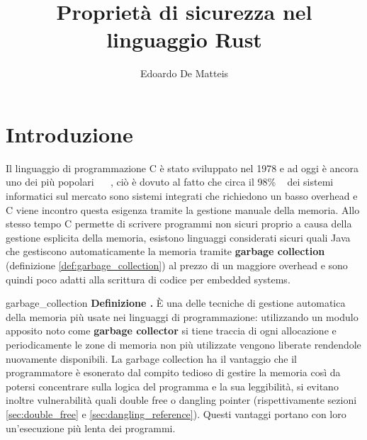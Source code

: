 \documentclass[Lau,binding=0.6cm]{sapthesis}
\title{Proprietà di sicurezza nel linguaggio Rust}
\author{Edoardo De Matteis}
\newenvironment{myDefinition}[2]{ \begin{Definizione}[adjusted title=#1]{}{#2}
    \textbf{Definizione \thetcbcounter.} }{\end{Definizione}}
\begin{document}
\frontmatter

\maketitle




\tableofcontents


\mainmatter

\chapter{Introduzione} \label{sec:politica_di_sicurezza}
Il linguaggio di programmazione C è stato sviluppato nel 1978 e ad oggi è ancora uno dei più popolari ~\cite{tiobe:index} ~\cite{pypl:index}, ciò è dovuto al fatto che circa il 98\% ~\cite{real_men_program_in_c} dei sistemi informatici sul mercato sono sistemi integrati che richiedono un basso overhead e C viene incontro questa esigenza tramite la gestione manuale della memoria. 
Allo stesso tempo C permette di scrivere programmi non sicuri proprio a causa della gestione esplicita della memoria, esistono linguaggi considerati sicuri quali Java che gestiscono automaticamente la memoria tramite \textbf{garbage collection} (definizione \ref{def:garbage_collection}) al prezzo di un maggiore overhead e sono quindi poco adatti alla scrittura di codice per embedded systems.

\begin{myDefinition}{Garbage collection}{garbage_collection}
    È una delle tecniche di gestione automatica della memoria più usate nei linguaggi di programmazione: utilizzando un modulo apposito noto come \textbf{garbage collector} si tiene traccia di ogni allocazione e periodicamente le zone di memoria non più utilizzate vengono liberate rendendole nuovamente disponibili. La garbage collection ha il vantaggio che il programmatore è esonerato dal compito tedioso di gestire la memoria così da potersi concentrare sulla logica del programma e la sua leggibilità, si evitano inoltre vulnerabilità quali double free o dangling pointer (rispettivamente sezioni \ref{sec:double_free} e \ref{sec:dangling_reference}). Questi vantaggi portano con loro un'esecuzione più lenta dei programmi.
\end{myDefinition}
\end{document}
